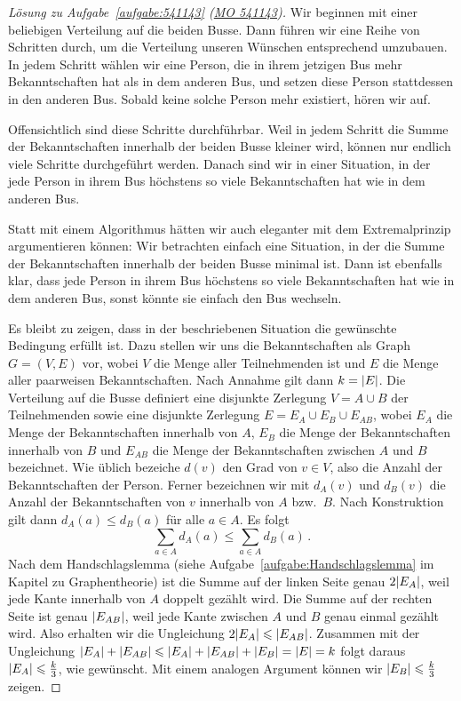 \begin{proof}[Lösung zu Aufgabe~\ref{aufgabe:541143} \textmd{(\href{https://www.mathematik-olympiaden.de/moev/index.php?option=com_download&thema=a&format=raw&datei=A54114a.pdf}{MO 541143})}]
	Wir beginnen mit einer beliebigen Verteilung auf die beiden Busse. Dann führen wir eine Reihe von Schritten durch, um die Verteilung unseren Wünschen entsprechend umzubauen. In jedem Schritt wählen wir eine Person, die in ihrem jetzigen Bus mehr Bekanntschaften hat als in dem anderen Bus, und setzen diese Person stattdessen in den anderen Bus. Sobald keine solche Person mehr existiert, hören wir auf.
	
	Offensichtlich sind diese Schritte durchführbar. Weil in jedem Schritt die Summe der Bekanntschaften innerhalb der beiden Busse kleiner wird, können nur endlich viele Schritte durchgeführt werden. Danach sind wir in einer Situation, in der jede Person in ihrem Bus höchstens so viele Bekanntschaften hat wie in dem anderen Bus.
	
	Statt mit einem Algorithmus hätten wir auch eleganter mit dem Extremalprinzip argumentieren können: Wir betrachten einfach eine Situation, in der die Summe der Bekanntschaften innerhalb der beiden Busse minimal ist. Dann ist ebenfalls klar, dass jede Person in ihrem Bus höchstens so viele Bekanntschaften hat wie in dem anderen Bus, sonst könnte sie einfach den Bus wechseln.
	
	Es bleibt zu zeigen, dass in der beschriebenen Situation die gewünschte Bedingung erfüllt ist. Dazu stellen wir uns die Bekanntschaften als Graph $G=(V,E)$ vor, wobei $V$ die Menge aller Teilnehmenden ist und $E$ die Menge aller paarweisen Bekanntschaften. Nach Annahme gilt dann $k=\lvert E\rvert$. Die Verteilung auf die Busse definiert eine disjunkte Zerlegung $V=A\cup B$ der Teilnehmenden sowie eine disjunkte Zerlegung $E=E_A\cup E_B\cup E_{AB}$, wobei $E_A$ die Menge der Bekanntschaften innerhalb von $A$, $E_B$ die Menge der Bekanntschaften innerhalb von $B$ und $E_{AB}$ die Menge der Bekanntschaften zwischen $A$ und $B$ bezeichnet. Wie üblich bezeiche $d(v)$ den Grad von $v\in V$, also die Anzahl der Bekanntschaften der Person. Ferner bezeichnen wir mit $d_A(v)$ und $d_B(v)$ die Anzahl der Bekanntschaften von $v$ innerhalb von $A$ bzw.\ $B$. Nach Konstruktion gilt dann $d_A(a)\leqslant d_B(a)$ für alle $a\in A$. Es folgt
	\begin{equation*}
		\sum_{a\in A}d_A(a)\leqslant \sum_{a\in A}d_B(a)\,.
	\end{equation*}
	Nach dem Handschlagslemma (siehe Aufgabe~\ref{aufgabe:Handschlagslemma} im Kapitel zu Graphentheorie) ist die Summe auf der linken Seite genau $2\lvert E_A\rvert$, weil jede Kante innerhalb von $A$ doppelt gezählt wird. Die Summe auf der rechten Seite ist genau $\lvert E_{AB}\rvert$, weil jede Kante zwischen $A$ und $B$ genau einmal gezählt wird. Also erhalten wir die Ungleichung $2\lvert E_A\rvert\leqslant \lvert E_{AB}\rvert$. Zusammen mit der Ungleichung $\lvert E_A\rvert+\lvert E_{AB}\rvert\leqslant \lvert E_A\rvert+\lvert E_{AB}\rvert+\lvert E_B\rvert=\lvert E\rvert=k$ folgt daraus $\lvert E_A\rvert\leqslant \frac k3$, wie gewünscht. Mit einem analogen Argument können wir $\lvert E_B\rvert\leqslant \frac k3$ zeigen.
\end{proof}